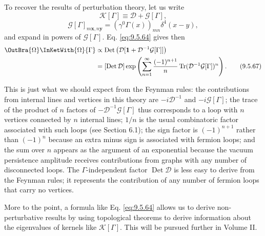 To recover the results of perturbation theory, let us write
\begin{equation}
\mathcal{K}[\Gamma]\equiv\mathcal{D}+\mathcal{G}[\Gamma],
\tag{9.5.65}\label{eq:9.5.65}
\end{equation}
\begin{equation}
\mathcal{G}[\Gamma]_{m\mathbf{x},n\mathbf{y}}
=(\gamma^0\Gamma(x))_{mn}\delta^4(x-y),
\tag{9.5.66}\label{eq:9.5.66}
\end{equation}
and expand in powers of $\mathcal{G}[\Gamma]$. Eq. \eqref{eq:9.5.64} gives then
\begin{align}
\OutBra{\Omega}\InKetWith{\Omega}{\Gamma}
&\propto\operatorname{Det}
 \left(\mathcal{D}[\mathbf{1}+\mathcal{D}^{-1}\mathcal{G}[\Gamma]]\right)
\notag\\
&=[\operatorname{Det}\mathcal{D}]
 \exp\left(\sum_{n=1}^{\infty}\frac{(-1)^{n+1}}{n}
 \operatorname{Tr}(\mathcal{D}^{-1}\mathcal{G}[\Gamma])^n\right).
\tag{9.5.67}\label{eq:9.5.67}
\end{align}

This is just what we should expect from the Feynman rules: the contributions
from internal lines and vertices in this theory are $-i\mathcal{D}^{-1}$ and
$-i\mathcal{G}[\Gamma]$; the trace of the product of $n$ factors of
$-\mathcal{D}^{-1}\mathcal{G}[\Gamma]$ thus corresponds to a loop with $n$
vertices connected by $n$ internal lines; $1/n$ is the usual combinatoric
factor associated with such loops (see Section 6.1); the sign factor is
$(-1)^{n+1}$ rather than $(-1)^n$ because an extra minus sign is associated
with fermion loops; and the sum over $n$ appears as the argument of an
exponential because the vacuum persistence amplitude receives contributions
from graphs with any number of disconnected loops. The $\Gamma$-independent
factor $\operatorname{Det}\mathcal{D}$ is less easy to derive from the Feynman
rules; it represents the contribution of any number of fermion loops that
carry no vertices.

More to the point, a formula like Eq. \eqref{eq:9.5.64} allows us to derive
non-perturbative results by using topological theorems to derive information
about the eigenvalues of kernels like $\mathcal{K}[\Gamma]$. This will be
pursued further in Volume II.
